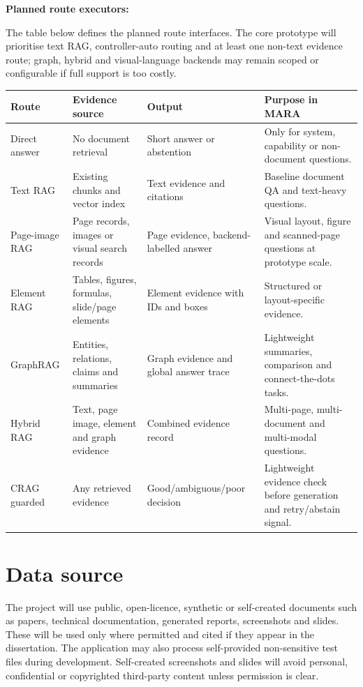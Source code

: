 \documentclass[a4paper,11pt]{article}
\begin{document}
\textbf{Planned route executors:}

The table below defines the planned route interfaces. The core prototype will prioritise text RAG, controller-auto routing and at least one non-text evidence route; graph, hybrid and visual-language backends may remain scoped or configurable if full support is too costly.

\begin{center}
\scriptsize
\begin{tabularx}{\textwidth}{p{}p{}p{}X}
\toprule
Route & Evidence source & Output & Purpose in MARA \\
\midrule
Direct answer & No document retrieval & Short answer or abstention & Only for system, capability or non-document questions. \\
Text RAG & Existing chunks and vector index & Text evidence and citations & Baseline document QA and text-heavy questions. \\
Page-image RAG & Page records, images or visual search records & Page evidence, backend-labelled answer & Visual layout, figure and scanned-page questions at prototype scale. \\
Element RAG & Tables, figures, formulas, slide/page elements & Element evidence with IDs and boxes & Structured or layout-specific evidence. \\
GraphRAG & Entities, relations, claims and summaries & Graph evidence and global answer trace & Lightweight summaries, comparison and connect-the-dots tasks. \\
Hybrid RAG & Text, page image, element and graph evidence & Combined evidence record & Multi-page, multi-document and multi-modal questions. \\
CRAG guarded & Any retrieved evidence & Good/ambiguous/poor decision & Lightweight evidence check before generation and retry/abstain signal. \\
\bottomrule
\end{tabularx}
\end{center}

\section{Data source}

The project will use public, open-licence, synthetic or self-created documents such as papers, technical documentation, generated reports, screenshots and slides. These will be used only where permitted and cited if they appear in the dissertation. The application may also process self-provided non-sensitive test files during development. Self-created screenshots and slides will avoid personal, confidential or copyrighted third-party content unless permission is clear.
\end{document}
